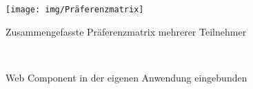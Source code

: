 \begin{figure}[hbt!]
	\centering
	\begin{minipage}[t]{0.65\textwidth}	
		\caption{Zusammengefasste Präferenzmatrix mehrerer Teilnehmer}
		\texttt{[image: img/Präferenzmatrix]}\\ %
		\label{fig:PraeferenzmatrixBefuellt}
	\end{minipage}
\end{figure}

\newpage
\begin{figure}[hbt!]
	\centering
	\begin{minipage}[t]{0.65\textwidth}	
		\caption{Web Component in der eigenen Anwendung eingebunden}
		\\ %
		\label{fig:WCSelbstEinbindung}
	\end{minipage}
\end{figure}

